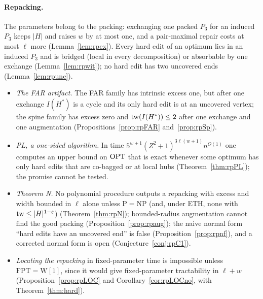 \paragraph{Repacking.} The parameters belong to the packing: exchanging one packed $P_3$ for an induced $P_3$ keeps $|H|$ and raises $w$ by at most one, and a pair-maximal repair costs at most $\ell$ more (Lemma~\ref{lem:rpex}). Every hard edit of an optimum lies in an induced $P_3$ and is bridged (local in every decomposition) or absorbable by one exchange (Lemma~\ref{lem:rpwit}); no hard edit has two uncovered ends (Lemma~\ref{lem:rpunc}).
\begin{itemize}
\item \emph{The FAR artifact.} The FAR family has intrinsic excess one, but after one exchange $I(H^*)$ is a cycle and its only hard edit is at an uncovered vertex; the spine family has excess zero and $\mathrm{tw}(I(H^*))\le2$ after one exchange and one augmentation (Propositions~\ref{prop:rpFAR} and~\ref{prop:rpSp}).
\item \emph{PL, a one-sided algorithm.} In time $5^{w+1}(Z^2+1)^{3\ell(w+1)}n^{O(1)}$ one computes an upper bound on $\mathrm{OPT}$ that is exact whenever some optimum has only hard edits that are co-bagged or at local hubs (Theorem~\ref{thm:rpPL}); the promise cannot be tested.
\item \emph{Theorem N.} No polynomial procedure outputs a repacking with excess and width bounded in $\ell$ alone unless $\mathrm P=\mathrm{NP}$ (and, under ETH, none with $\mathrm{tw}\le|H|^{1-\varepsilon}$) (Theorem~\ref{thm:rpN}); bounded-radius augmentation cannot find the good packing (Proposition~\ref{prop:rpaug}); the naive normal form ``hard edits have an uncovered end'' is false (Proposition~\ref{prop:rpnf}), and a corrected normal form is open (Conjecture~\ref{conj:rpC1}).
\item \emph{Locating the repacking} in fixed-parameter time is impossible unless $\mathrm{FPT}=\mathrm{W[1]}$, since it would give fixed-parameter tractability in $\ell+w$ (Proposition~\ref{prop:rpLOC} and Corollary~\ref{cor:rpLOCno}, with Theorem~\ref{thm:hard}).
\end{itemize}
